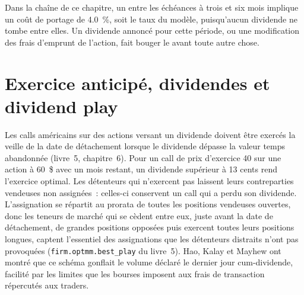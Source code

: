 Dans la chaîne de ce chapitre, un  entre les échéances à trois et six mois implique un coût de portage de 4.0~\%, soit le taux du modèle, puisqu'aucun dividende ne tombe
entre elles. Un dividende annoncé pour cette période, ou une modification des frais d'emprunt de l'action, fait bouger le  avant toute autre chose.

\section{Exercice anticipé, dividendes et dividend play}

Les calls américains sur des actions versant un dividende doivent être exercés la veille de la date de détachement lorsque le dividende dépasse la valeur temps abandonnée
(livre~5, chapitre~6). Pour un call de prix d'exercice 40 sur une action à 60~\$ avec un mois restant, un dividende supérieur à 13 cents rend l'exercice optimal. Les détenteurs qui
n'exercent pas laissent leurs contreparties vendeuses non assignées~: celles-ci conservent un call qui a perdu son dividende. L'assignation se répartit au prorata de toutes les positions
vendeuses ouvertes, donc les teneurs de marché qui se cèdent entre eux, juste avant la date de détachement, de grandes positions opposées puis exercent toutes leurs positions longues, captent l'essentiel des
assignations que les détenteurs distraits n'ont pas provoquées (\texttt{firm.optmm.best\_play} du livre~5). Hao, Kalay et Mayhew ont montré que ce schéma
gonflait le volume déclaré le dernier jour cum-dividende, facilité par les limites que les bourses imposent aux frais de transaction répercutés aux traders.

